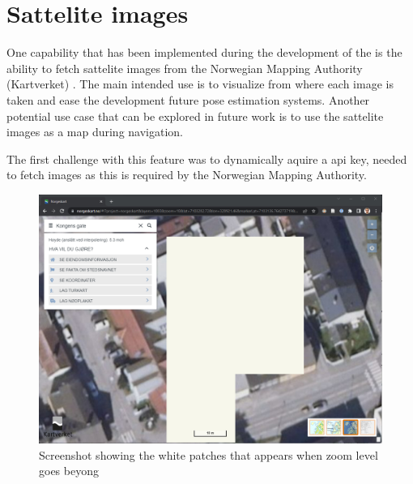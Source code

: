 \section{Sattelite images}
One capability that has been implemented during the development of the \gui is the ability to fetch sattelite images from the Norwegian Mapping Authority (Kartverket) \cite{kartverketNorgeskart}.
The main intended use is to visualize from where each image is taken and ease the development future pose estimation systems.
Another potential use case that can be explored in future work is to use the sattelite images as a map during navigation.

The first challenge with this feature was to dynamically aquire a api key, needed to fetch images as this is required by the Norwegian Mapping Authority.


\begin{figure}
    \centering
    \includegraphics[width=\textwidth]{figures/norgeskart_bug.png}
    \caption{Screenshot showing the white patches that appears when zoom level goes beyong \todo \cite{kartverketNorgeskart}}
    \label{fig:norgeskart_bug}
\end{figure}